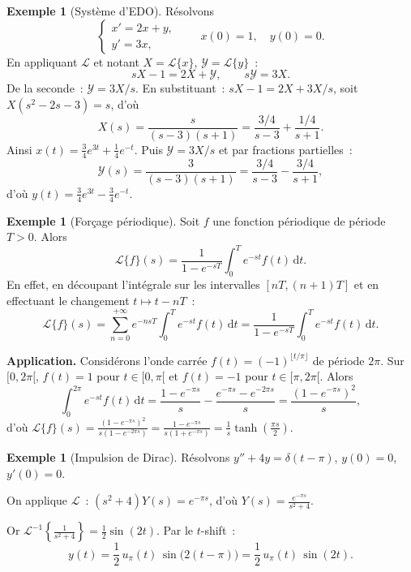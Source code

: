 \documentclass[12pt,a4paper,openany]{book}
\theoremstyle{definition}
\newtheorem{exemple}[definition]{Exemple}
\theoremstyle{plain}
\theoremstyle{remark}
\newcommand{\dd}{\mathrm{d}}
\begin{document}
\begin{exemple}[Système d'EDO]\label{ex:laplace-systeme}
  Résolvons
  \[
    \begin{cases}
      x'=2x+y, \\
      y'=3x,
    \end{cases}
    \qquad x(0)=1,\quad y(0)=0.
  \]
  En appliquant $\mathcal{L}$ et notant $X=\mathcal{L}\{x\}$,
  $\mathscr{Y}=\mathcal{L}\{y\}$~:
  \[
    sX-1=2X+\mathscr{Y}, \qquad s\mathscr{Y}=3X.
  \]
  De la seconde~: $\mathscr{Y}=3X/s$. En substituant~:
  $sX-1=2X+3X/s$, soit $X(s^2-2s-3)=s$, d'où
  \[
    X(s) = \frac{s}{(s-3)(s+1)}
    = \frac{3/4}{s-3}+\frac{1/4}{s+1}.
  \]
  Ainsi $x(t)=\frac{3}{4}e^{3t}+\frac{1}{4}e^{-t}$.
  Puis $\mathscr{Y}=3X/s$ et par fractions partielles~:
  \[
    \mathscr{Y}(s) = \frac{3}{(s-3)(s+1)}
    = \frac{3/4}{s-3}-\frac{3/4}{s+1},
  \]
  d'où $y(t)=\frac{3}{4}e^{3t}-\frac{3}{4}e^{-t}$.
\end{exemple}

\begin{exemple}[Forçage périodique]\label{ex:laplace-periodique}
  Soit $f$ une fonction périodique de période $T>0$. Alors
  \[
    \mathcal{L}\{f\}(s) = \frac{1}{1-e^{-sT}}\int_0^{T}e^{-st}f(t)\,\dd t.
  \]
  En effet, en découpant l'intégrale sur les intervalles $[nT,(n+1)T]$
  et en effectuant le changement $t\mapsto t-nT$~:
  \[
    \mathcal{L}\{f\}(s)
    = \sum_{n=0}^{+\infty}e^{-nsT}\int_0^{T}e^{-st}f(t)\,\dd t
    = \frac{1}{1-e^{-sT}}\int_0^{T}e^{-st}f(t)\,\dd t.
  \]

  \textbf{Application.} Considérons l'onde carrée
  $f(t)=(-1)^{\lfloor t/\pi\rfloor}$ de période $2\pi$.
  Sur $[0,2\pi[$, $f(t)=1$ pour $t\in[0,\pi[$ et $f(t)=-1$
  pour $t\in[\pi,2\pi[$. Alors
  \[
    \int_0^{2\pi}e^{-st}f(t)\,\dd t
    = \frac{1-e^{-\pi s}}{s}-\frac{e^{-\pi s}-e^{-2\pi s}}{s}
    = \frac{(1-e^{-\pi s})^2}{s},
  \]
  d'où $\mathcal{L}\{f\}(s)
  =\frac{(1-e^{-\pi s})^2}{s(1-e^{-2\pi s})}
  =\frac{1-e^{-\pi s}}{s(1+e^{-\pi s})}
  =\frac{1}{s}\tanh\!\left(\frac{\pi s}{2}\right)$.
\end{exemple}

\begin{exemple}[Impulsion de Dirac]\label{ex:laplace-dirac}
  Résolvons $y''+4y=\delta(t-\pi)$, $y(0)=0$, $y'(0)=0$.

  On applique $\mathcal{L}$~: $(s^2+4)Y(s)=e^{-\pi s}$, d'où
  $Y(s)=\frac{e^{-\pi s}}{s^2+4}$.

  Or $\mathcal{L}^{-1}\left\{\frac{1}{s^2+4}\right\}=\frac{1}{2}\sin(2t)$.
  Par le $t$-shift~:
  \[
    y(t)=\frac{1}{2}\,u_\pi(t)\,\sin\bigl(2(t-\pi)\bigr)
    = \frac{1}{2}\,u_\pi(t)\,\sin(2t).
  \]
\end{exemple}
\end{document}
